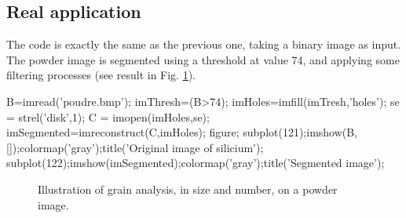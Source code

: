 \subsection{Real application}
The code is exactly the same as the previous one, taking a binary image as input. The powder image is segmented using a threshold at value 74, and applying some filtering processes (see result in Fig. \ref{fig:granulometry:matlab:segmented}).

\begin{matlab}
B=imread('poudre.bmp');
imThresh=(B>74);
imHoles=imfill(imTresh,'holes');
se = strel('disk',1);
C = imopen(imHoles,se);
imSegmented=imreconstruct(C,imHoles);
figure;
subplot(121);imshow(B,[]);colormap('gray');title('Original image of silicium');
subplot(122);imshow(imSegmented);colormap('gray');title('Segmented image');
\end{matlab}
\begin{figure}[htbp]
 \centering
 \hfill
 
 \caption{Illustration of grain analysis, in size and number, on a powder image.}
 \label{fig:granulometry:matlab:segmented}
\end{figure}
